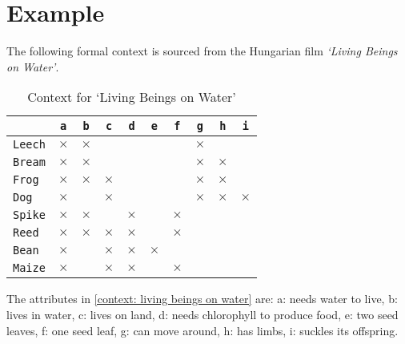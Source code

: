 \section{Example}
\label{section: example}

\begin{example}
	The following formal context is sourced from the Hungarian film \textit{`Living Beings on Water'}.
	\small{
		\begin{table}[htbp]
			\centering
			\begin{tabular}{l|c|c|c|c|c|c|c|c|c}
				               & \texttt{a} & \texttt{b} & \texttt{c} & \texttt{d} & \texttt{e} & \texttt{f} & \texttt{g} & \texttt{h} & \texttt{i} \\
				\hline
				\texttt{Leech} & $\times$   & $\times$   &            &            &            &            & $\times$   &            &            \\
				\hline
				\texttt{Bream} & $\times$   & $\times$   &            &            &            &            & $\times$   & $\times$   &            \\
				\hline
				\texttt{Frog}  & $\times$   & $\times$   & $\times$   &            &            &            & $\times$   & $\times$   &            \\
				\hline
				\texttt{Dog}   & $\times$   &            & $\times$   &            &            &            & $\times$   & $\times$   & $\times$   \\
				\hline
				\texttt{Spike} & $\times$   & $\times$   &            & $\times$   &            & $\times$   &            &            &            \\
				\hline
				\texttt{Reed}  & $\times$   & $\times$   & $\times$   & $\times$   &            & $\times$   &            &            &            \\
				\hline
				\texttt{Bean}  & $\times$   &            & $\times$   & $\times$   & $\times$   &            &            &            &            \\
				\hline
				\texttt{Maize} & $\times$   &            & $\times$   & $\times$   &            & $\times$   &            &            &            \\
			\end{tabular}
			\caption{Context for `Living Beings on Water'}
			\label{context: living beings on water}
		\end{table}
	}
	The attributes in \autoref{context: living beings on water} are: a: needs water to live, b: lives in water, c: lives on land, d: needs chlorophyll to produce food, e: two seed leaves, f: one seed leaf, g: can move around, h: has limbs, i: suckles its offspring.

\end{example}

